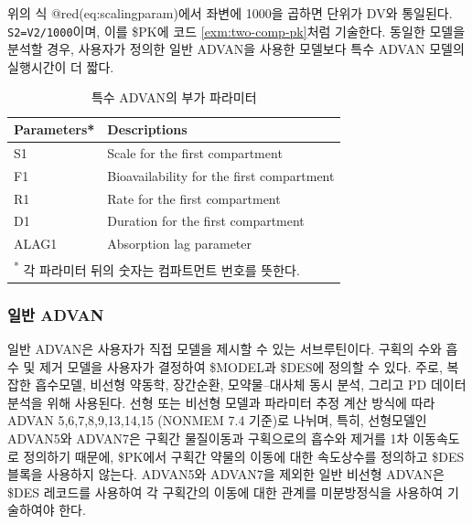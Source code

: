 \documentclass[
  10pt,
  krantz2,
  a4paper]{krantz}
\theoremstyle{definition}
\theoremstyle{definition}
\theoremstyle{definition}
\theoremstyle{remark}
\begin{document}
위의 식 @red(eq:scalingparam)에서 좌변에 1000을 곱하면 단위가 DV와 통일된다. \texttt{S2=V2/1000}이며, 이를 \$PK에 코드 \ref{exm:two-comp-pk}처럼 기술한다. 동일한 모델을 분석할 경우, 사용자가 정의한 일반 ADVAN을 사용한 모델보다 특수 ADVAN 모델의 실행시간이 더 짧다.

\begin{table}[!h]

\caption{\label{tab:advan-param}특수 ADVAN의 부가 파라미터}
\centering
\begin{tabular}[t]{ll}
\toprule
Parameters* & Descriptions\\
\midrule
\rowcolor{gray!6}  S1 & Scale for the first compartment\\
F1 & Bioavailability for the first compartment\\
\rowcolor{gray!6}  R1 & Rate for the first compartment\\
D1 & Duration for the first compartment\\
\rowcolor{gray!6}  ALAG1 & Absorption lag parameter\\
\bottomrule
\multicolumn{2}{l}{\textsuperscript{*} 각 파라미터 뒤의 숫자는 컴파트먼트 번호를 뜻한다.}\\
\end{tabular}
\end{table}


\hypertarget{uxc77cuxbc18-advan}{%
\subsubsection{일반 ADVAN}\label{uxc77cuxbc18-advan}}

일반 ADVAN은 사용자가 직접 모델을 제시할 수 있는 서브루틴이다. 구획의 수와 흡수 및 제거 모델을 사용자가 결정하여 \$MODEL과 \$DES에 정의할 수 있다. 주로, 복잡한 흡수모델, 비선형 약동학, 장간순환, 모약물--대사체 동시 분석, 그리고 PD 데이터 분석을 위해 사용된다. 선형 또는 비선형 모델과 파라미터 추정 계산 방식에 따라 ADVAN 5,6,7,8,9,13,14,15 (NONMEM 7.4 기준)로 나뉘며, 특히, 선형모델인 ADVAN5와 ADVAN7은 구획간 물질이동과 구획으로의 흡수와 제거를 1차 이동속도로 정의하기 때문에, \$PK에서 구획간 약물의 이동에 대한 속도상수를 정의하고 \$DES 블록을 사용하지 않는다. ADVAN5와 ADVAN7을 제외한 일반 비선형 ADVAN은 \$DES 레코드를 사용하여 각 구획간의 이동에 대한 관계를 미분방정식을 사용하여 기술하여야 한다.
\end{document}
